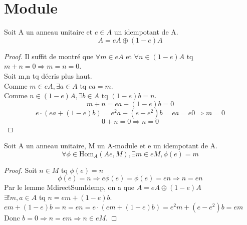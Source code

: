 \chapter{Module}

\begin{lemma}[MdirectSumIdemp]
    \label{MdirectSumIdemp}
    Soit A un anneau unitaire et $e \in A$ un idempotant de A.
    \[ A = e A \oplus (1-e) A \]
\end{lemma}
\begin{proof}
    Il suffit de montré que
    $\forall m \in e A$ et $\forall n \in (1-e) A$ tq $m+n=0 \Rightarrow m=n=0$.\\
    Soit m,n tq décris plus haut.\\
    Comme $m \in e A, \exists a \in A$ tq $e a = m$.\\
    Comme $n \in (1-e) A, \exists b \in A$ tq $(1-e) b = n$.\\
    \[ m+n=e a + (1-e) b = 0\]
    \[ e \cdot (e a + (1-e) b) = e^{2} a + (e - e^{2}) b = e a = e 0 \Rightarrow m=0\]
    \[ 0+n=0 \Rightarrow n=0\]
\end{proof}

\begin{lemma}[HomAeM]
    \label{HomAeM}
    Soit A un anneau unitaire, M un A-module et e un idempotant de A.
    \[ \forall \phi \in \text{Hom}_{A}(Ae,M), \exists m \in e M, \phi(e)=m\]
\end{lemma}
\begin{proof}
    Soit $ n \in M$ tq $\phi(e)=n$
    \[ \phi(e) = n \Rightarrow e \phi(e) = \phi(e) = e n \Rightarrow n = e n \]
    Par le lemme MdirectSumIdemp, on a que $A = e A \oplus (1-e) A$\\
    $\exists ! m,a \in A$ tq $n = e m + (1-e) b$.\\
    $e m + (1-e) b = n = e n = e \cdot (e m + (1-e) b) = e^{2} m + (e - e^{2}) b = e m$\\
    Donc $b = 0 \Rightarrow n= em \Rightarrow n \in e M$.
\end{proof}

